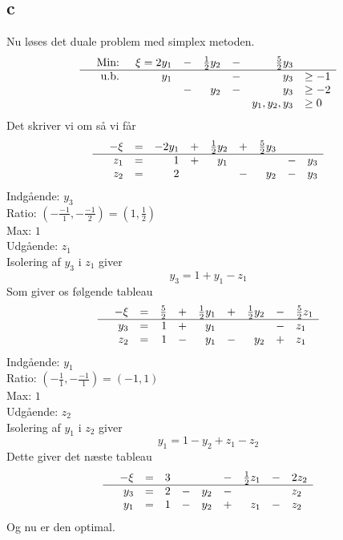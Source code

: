 \documentclass[a4paper]{article}
\begin{document}
\subsection*{c}
Nu løses det duale problem med simplex metoden.
\begin{equation}
\begin{array}{rrrrrrrl}
&\text{Min: } &\xi=2y_1 &- &\frac{1}{2}y_2 &- &\frac{5}{2}y_3 & \\
\hline
&\text{u.b. } &y_1 & & &- &y_3 &\geq -1 \\
& & &- &y_2 &- &y_3 &\geq -2 \\
& & & & & &y_1,y_2,y_3 &\geq 0
\end{array}
\end{equation}
Det skriver vi om så vi får
\begin{equation}
\begin{array}{rrrrrrrrrl}
&-\xi&=&-2y_1 &+ &\frac{1}{2}y_2 &+ &\frac{5}{2}y_3& \\
\hline
&z_1&=&1&+&y_1&&&-&y_3 \\
&z_2&=&2&&&-&y_2 &- &y_3  \\
\end{array}
\end{equation}
Indgående: $y_3$ \\
Ratio: $(-\frac{-1}{1},-\frac{-1}{2})=(1,\frac{1}{2})$ \\
Max: $1$ \\
Udgående: $z_1$ \\
Isolering af $y_3$ i $z_1$ giver
$$y_3=1+y_1-z_1$$
Som giver os følgende tableau
\begin{equation}
\begin{array}{rrrrrrrrrl}
&-\xi&=&\frac{5}{2}&+&\frac{1}{2}y_1 &+&\frac{1}{2}y_2&- &\frac{5}{2}z_1 \\
\hline
&y_3&=&1&+&y_1&&&-&z_1 \\
&z_2&=&1&-&y_1&-&y_2&+ &z_1  \\
\end{array}
\end{equation}
Indgående: $y_1$ \\
Ratio: $(-\frac{1}{1},-\frac{-1}{1})=(-1,1)$ \\
Max: $1$ \\
Udgående: $z_2$ \\
Isolering af $y_1$ i $z_2$ giver
$$y_1=1-y_2+z_1-z_2$$
Dette giver det næste tableau
\begin{equation}
\begin{array}{rrrrrrrrrl}
&-\xi&=&3&&&-&\frac{1}{2}z_1 &-&2z_2 \\
\hline
&y_3&=&2&-&y_2&-&&&z_2 \\
&y_1&=&1&-&y_2&+&z_1&- &z_2  \\
\end{array}
\end{equation}
Og nu er den optimal.
\end{document}
